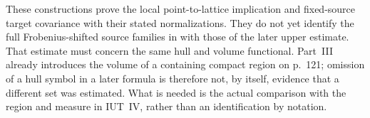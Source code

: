 These constructions prove the local point-to-lattice implication and
fixed-source target covariance with their stated normalizations.
They do not yet identify the full Frobenius-shifted source families in
\cite[Theorem~6.10.1]{JoshiIV} with those of the later upper estimate.
That estimate must concern the same hull and volume functional.
Part~III already introduces the
volume of a containing compact region on p.~121; omission of a hull symbol
in a later formula is therefore not, by itself, evidence that a different
set was estimated. What is needed is the actual comparison with the
region and measure in IUT~IV, rather than an identification by notation.
